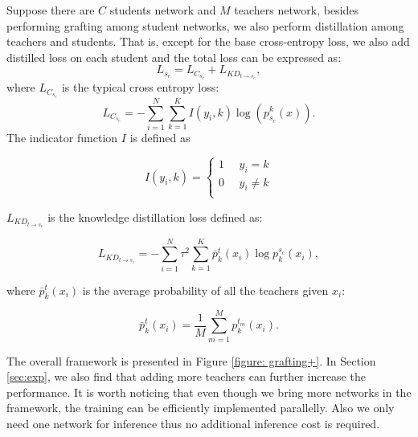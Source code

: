 \documentclass{article}
\begin{document}
Suppose there are $C$ students network and $M$ teachers network, besides performing grafting among student networks, we also perform distillation among teachers and students. That is, except for the base cross-entropy loss, we also add distilled loss on each student and the total loss can be expressed as:
\begin{equation}
	L_{s_{c}} = L_{C_{s_{c}}} + L_{KD_{t\rightarrow s_{c}}},
\end{equation}
where $ L_{C_{s_{c}}}$ is the typical cross entropy loss:
\begin{equation}
	L_{C_{s_{c}}} = -\sum_{i=1}^{N}\sum_{k=1}^{K}I(y_{i},k)\log(p_{s_{c}}^{k}(x)).
\end{equation}
The indicator function $I$ is defined as 

\begin{equation}
	I(y_{i},k) = 
	\left\{
	\begin{array}{c}
		1 ~~~~~~ y_{i} = k   \\
		0 ~~~~~~ y_{i}\neq k  \\
	\end{array}
	\right.
\end{equation}

$L_{KD_{t\rightarrow s_{c}}}$ is the knowledge distillation loss defined as:

\begin{equation}\label{eq_distill}
	L_{KD_{t\rightarrow s_{c}}}= - \sum_{i=1}^{N}\tau^{2}\sum_{k=1}^{K}\bar{p}^{t}_{k}(x_{i}) \log p^{s_{c}}_{k}(x_{i}),
\end{equation}

where $\bar{p}^{t}_{k}(x_{i})$ is the average probability of all the teachers given $x_{i}$:

\begin{equation}
	\bar{p}^{t}_{k}(x_{i}) = \frac{1}{M} \sum_{m=1}^{M} p^{t_{m}}_{k}(x_{i}).
\end{equation}

The overall framework is presented in Figure \ref{figure: grafting+}. In Section \ref{sec:exp}, we also find that adding more teachers can further
increase the performance. It is worth noticing that even though we bring more networks in the framework, the training can be efficiently implemented parallelly. Also we only need one network for inference thus no additional inference cost is required.
\end{document}
